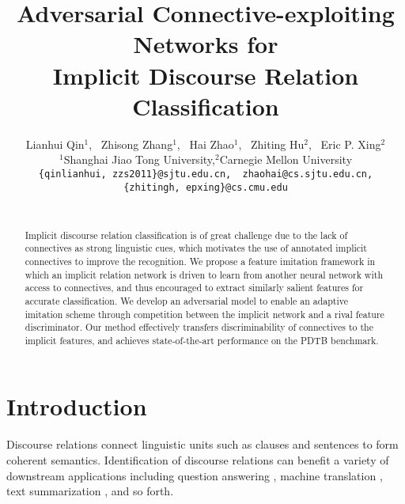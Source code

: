 \documentclass[11pt,a4paper]{article}
\title{Adversarial Connective-exploiting Networks for \\ Implicit Discourse Relation Classification}
\author{Lianhui Qin$^1$,~ Zhisong Zhang$^1$,~ Hai Zhao$^1$,~ Zhiting Hu$^2$,~ Eric P. Xing$^2$\\
$^1$Shanghai Jiao Tong University,\quad $^2$Carnegie Mellon University \\
  {\tt \{qinlianhui, zzs2011\}@sjtu.edu.cn,~ zhaohai@cs.sjtu.edu.cn,}\\ 
  {\tt \{zhitingh, epxing\}@cs.cmu.edu} \\ 
  \\}
\date{}
\begin{document}
\maketitle
\begin{abstract}
Implicit discourse relation classification is of great challenge due to the lack of connectives as strong linguistic cues, which motivates the use of annotated implicit connectives to improve the recognition.
We propose a feature imitation framework in which an implicit relation network is driven to learn from another neural network with access to connectives, and thus encouraged to extract similarly salient features for accurate classification. We develop an adversarial model to enable an adaptive imitation scheme through competition between the implicit network and a rival feature discriminator. Our method effectively transfers discriminability of connectives to the implicit features, and achieves state-of-the-art performance on the PDTB benchmark. 
\end{abstract}

\section{Introduction}

Discourse relations connect linguistic units such as clauses and sentences to form coherent semantics. Identification of discourse relations
can benefit a variety of downstream applications including question answering \cite{D13-1070}, machine translation \cite{P14-2047}, text summarization \cite{D14-1168}, and so forth.
\end{document}
